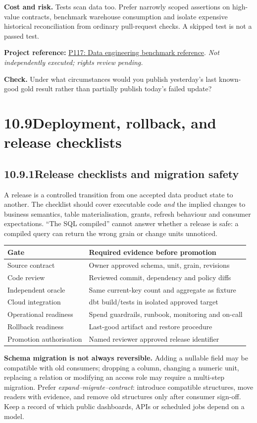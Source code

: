 \documentclass[11pt,twoside]{article}
\newcommand{\topic}[2]{\subsection*{#1\quad #2}}
\newcommand{\repo}[2]{\par\begingroup\fontsize{8.0}{9.6}\selectfont\sffamily\color{inkgray}\textbf{Project reference:} \href{#2}{#1}. \textit{Not independently executed; rights review pending.}\par\endgroup}
\begin{document}
\textbf{Cost and risk.} Tests scan data too. Prefer narrowly scoped assertions on high-value contracts, benchmark warehouse consumption and isolate expensive historical reconciliation from ordinary pull-request checks. A skipped test is not a passed test.
\repo{P117: Data engineering benchmark reference}{https://github.com/Snowflake-Labs/data-eng-bench}
\textbf{Check.} Under what circumstances would you publish yesterday's last known-good gold result rather than partially publish today's failed update?
\newpage
\section*{10.9\quad Deployment, rollback, and release checklists}
\topic{10.9.1}{Release checklists and migration safety}
A release is a controlled transition from one accepted data product state to another. The checklist should cover executable code \emph{and} the implied changes to business semantics, table materialisation, grants, refresh behaviour and consumer expectations. ``The SQL compiled'' cannot answer whether a release is safe: a compiled query can return the wrong grain or change units unnoticed.
\begin{center}\renewcommand{\arraystretch}{1.1}\begin{tabularx}{\linewidth}{@{}p{34mm}X@{}}\toprule
\textbf{Gate}&\textbf{Required evidence before promotion}\\\midrule
Source contract&Owner approved schema, unit, grain, revisions\\
Code review&Reviewed commit, dependency and policy diffs\\
Independent oracle&Same current-key count and aggregate as fixture\\
Cloud integration&dbt build/tests in isolated approved target\\
Operational readiness&Spend guardrails, runbook, monitoring and on-call\\
Rollback readiness&Last-good artifact and restore procedure\\
Promotion authorisation&Named reviewer approved release identifier\\\bottomrule\end{tabularx}\end{center}
\textbf{Schema migration is not always reversible.} Adding a nullable field may be compatible with old consumers; dropping a column, changing a numeric unit, replacing a relation or modifying an access role may require a multi-step migration. Prefer \emph{expand--migrate--contract}: introduce compatible structures, move readers with evidence, and remove old structures only after consumer sign-off. Keep a record of which public dashboards, APIs or scheduled jobs depend on a model.
\end{document}
